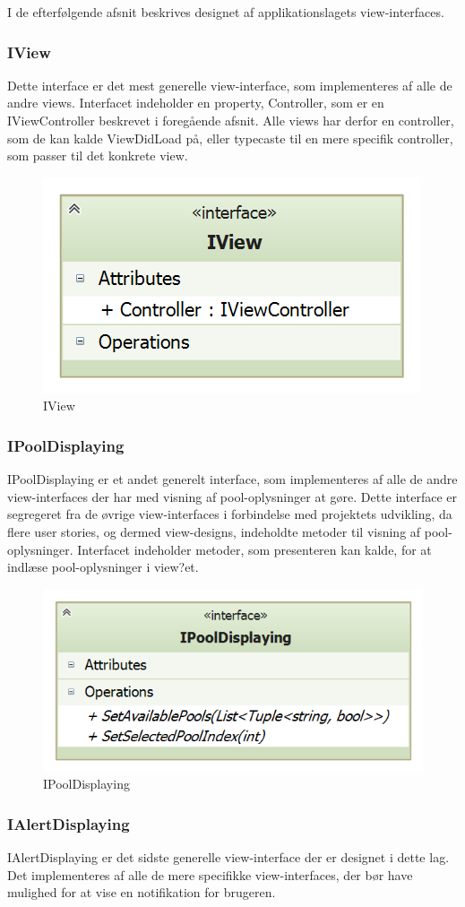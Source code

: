 I de efterfølgende afsnit beskrives designet af applikationslagets view-interfaces.

\subsubsection{IView}
Dette interface er det mest generelle view-interface, som implementeres af alle de andre views. Interfacet indeholder en property, Controller, som er en IViewController beskrevet i foregående afsnit. Alle views har derfor en controller, som de kan kalde ViewDidLoad på, eller typecaste til en mere specifik controller, som passer til det konkrete view.

\begin{figure}
	\centering
	\includegraphics[width=0.3\linewidth]{figs/design/application_iview}
	\caption{IView}
	\label{fig:application_iview}
\end{figure}

\subsubsection{IPoolDisplaying}
IPoolDisplaying er et andet generelt interface, som implementeres af alle de andre view-interfaces der har med visning af pool-oplysninger at gøre. Dette interface er segregeret fra de øvrige view-interfaces i forbindelse med projektets udvikling, da flere user stories, og dermed view-designs, indeholdte metoder til visning af pool-oplysninger. Interfacet indeholder metoder, som presenteren kan kalde, for at indlæse pool-oplysninger i view?et.

\begin{figure}
	\centering
	\includegraphics[width=0.4\linewidth]{figs/design/application_ipooldisplaying}
	\caption{IPoolDisplaying}
	\label{fig:application_ipooldisplaying}
\end{figure}

\subsubsection{IAlertDisplaying}
IAlertDisplaying er det sidste generelle view-interface der er designet i dette lag. Det implementeres af alle de mere specifikke view-interfaces, der bør have mulighed for at vise en notifikation for brugeren.

